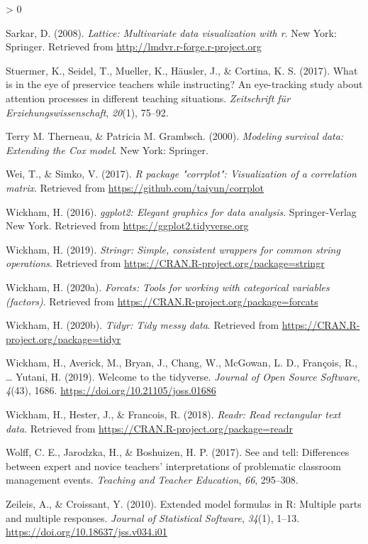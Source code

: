\documentclass[
  english,
  man,floatsintext]{apa6}
\newlength{\cslhangindent}
\newenvironment{CSLReferences}[2] %
 {%
  \setlength{\parindent}{0pt}
  \ifodd #1 \everypar{\setlength{\hangindent}{\cslhangindent}}\ignorespaces\fi
  \ifnum #2 > 0
  \setlength{\parskip}{#2\baselineskip}
  \fi
 }%
 {}
\begin{document}
\begin{CSLReferences}{1}{0}
\leavevmode\hypertarget{ref-R-lattice}{}%
Sarkar, D. (2008). \emph{Lattice: Multivariate data visualization with r}. New York: Springer. Retrieved from \url{http://lmdvr.r-forge.r-project.org}

\leavevmode\hypertarget{ref-stuermer2017eye}{}%
Stuermer, K., Seidel, T., Mueller, K., Häusler, J., \& Cortina, K. S. (2017). What is in the eye of preservice teachers while instructing? An eye-tracking study about attention processes in different teaching situations. \emph{Zeitschrift f{ü}r Erziehungswissenschaft}, \emph{20}(1), 75--92.

\leavevmode\hypertarget{ref-R-survival-book}{}%
Terry M. Therneau, \& Patricia M. Grambsch. (2000). \emph{Modeling survival data: Extending the {C}ox model}. New York: Springer.

\leavevmode\hypertarget{ref-R-corrplot2017}{}%
Wei, T., \& Simko, V. (2017). \emph{R package "corrplot": Visualization of a correlation matrix}. Retrieved from \url{https://github.com/taiyun/corrplot}

\leavevmode\hypertarget{ref-R-ggplot2}{}%
Wickham, H. (2016). \emph{ggplot2: Elegant graphics for data analysis}. Springer-Verlag New York. Retrieved from \url{https://ggplot2.tidyverse.org}

\leavevmode\hypertarget{ref-R-stringr}{}%
Wickham, H. (2019). \emph{Stringr: Simple, consistent wrappers for common string operations}. Retrieved from \url{https://CRAN.R-project.org/package=stringr}

\leavevmode\hypertarget{ref-R-forcats}{}%
Wickham, H. (2020a). \emph{Forcats: Tools for working with categorical variables (factors)}. Retrieved from \url{https://CRAN.R-project.org/package=forcats}

\leavevmode\hypertarget{ref-R-tidyr}{}%
Wickham, H. (2020b). \emph{Tidyr: Tidy messy data}. Retrieved from \url{https://CRAN.R-project.org/package=tidyr}

\leavevmode\hypertarget{ref-R-tidyverse}{}%
Wickham, H., Averick, M., Bryan, J., Chang, W., McGowan, L. D., François, R., \ldots{} Yutani, H. (2019). Welcome to the {tidyverse}. \emph{Journal of Open Source Software}, \emph{4}(43), 1686. \url{https://doi.org/10.21105/joss.01686}

\leavevmode\hypertarget{ref-R-readr}{}%
Wickham, H., Hester, J., \& Francois, R. (2018). \emph{Readr: Read rectangular text data}. Retrieved from \url{https://CRAN.R-project.org/package=readr}

\leavevmode\hypertarget{ref-wolff2017see}{}%
Wolff, C. E., Jarodzka, H., \& Boshuizen, H. P. (2017). See and tell: Differences between expert and novice teachers' interpretations of problematic classroom management events. \emph{Teaching and Teacher Education}, \emph{66}, 295--308.

\leavevmode\hypertarget{ref-R-Formula}{}%
Zeileis, A., \& Croissant, Y. (2010). Extended model formulas in {R}: Multiple parts and multiple responses. \emph{Journal of Statistical Software}, \emph{34}(1), 1--13. \url{https://doi.org/10.18637/jss.v034.i01}

\end{CSLReferences}

\endgroup
\end{document}
